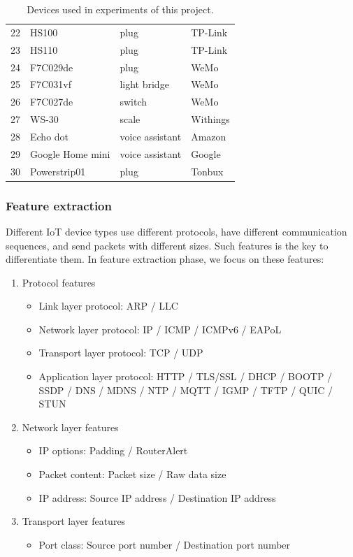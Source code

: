 \documentclass[twocolumn,10pt]{article}
\begin{document}
\begin{table}[]
\begin{tabular}{llll}
22     & HS100                      & plug             & TP-Link      \\
23     & HS110                      & plug             & TP-Link      \\
24     & F7C029de                   & plug             & WeMo         \\
25     & F7C031vf                   & light bridge     & WeMo         \\
26     & F7C027de                   & switch           & WeMo         \\
27     & WS-30                      & scale            & Withings     \\
28     & Echo dot                   & voice assistant  & Amazon       \\
29     & Google Home mini           & voice assistant  & Google       \\
30     & Powerstrip01               & plug             & Tonbux      
\end{tabular}
\caption{Devices used in experiments of this project.}
\label{tab: dev}
\end{table}


\subsubsection{Feature extraction}

Different IoT device types use different protocols, have different communication sequences, and send packets with different sizes. Such features is the key to differentiate them. In feature extraction phase, we focus on these features:

\begin{enumerate}
  \item Protocol features
  \begin{itemize}
  \item Link layer protocol: ARP / LLC
  \item Network layer protocol: IP / ICMP / ICMPv6 / EAPoL
  \item Transport layer protocol: TCP / UDP
  \item Application layer protocol: HTTP / TLS/SSL / DHCP / BOOTP / SSDP / DNS / MDNS / NTP / MQTT / IGMP / TFTP / QUIC / STUN
  \end{itemize}
  \item Network layer features
  \begin{itemize}
  \item IP options: Padding / RouterAlert
  \item Packet content:  Packet size / Raw data size
  \item IP address: Source IP address / Destination IP address 
  \end{itemize}
  \item Transport layer features
  \begin{itemize}
  \item Port class: Source port number / Destination port number
  \end{itemize}
\end{enumerate}
\end{document}
